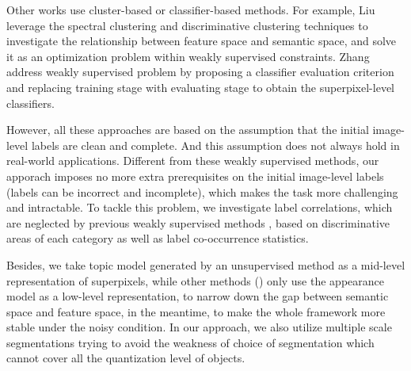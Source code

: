 Other works use cluster-based or classifier-based methods. For example, Liu \etal \cite{liu2013weakly} leverage the spectral clustering and discriminative clustering techniques to investigate the relationship between feature space and semantic space, and solve it as an optimization problem within weakly supervised constraints. Zhang \etal \cite{zhang2013sparse} address weakly supervised problem by proposing a classifier evaluation criterion and replacing training stage with evaluating stage to obtain the superpixel-level classifiers.

However, all these approaches are based on the assumption that the initial image-level labels are clean and complete. And this assumption does not always hold in real-world applications. Different from these weakly supervised methods, our apporach imposes no more extra prerequisites on the initial image-level labels (\eg labels can be incorrect and incomplete), which makes the task more challenging and intractable. To tackle this problem, we investigate label correlations, which are neglected by previous weakly supervised methods \cite{verbeek2007region,vezhnevets2010towards,vezhnevets2011weakly,vezhnevets2012weakly,xu2014tell}, based on discriminative areas of each category as well as label co-occurrence statistics. 

Besides, we take topic model generated by an unsupervised method as a mid-level representation of superpixels, while other methods (\eg \cite{vezhnevets2011weakly,xu2014tell}) only use the appearance model as a low-level representation, to narrow down the gap between semantic space and feature space, in the meantime, to make the whole framework more stable under the noisy condition. In our approach, we also utilize multiple scale segmentations trying to avoid the weakness of choice of segmentation which cannot cover all the quantization level of objects. 
